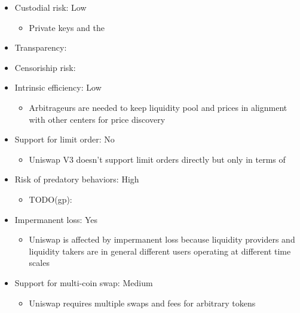 \documentclass[11pt, reqno]{amsart}
\begin{document}
\begin{itemize}
	\item Custodial risk: Low
	      \begin{itemize}
		      \item Private keys and the
	      \end{itemize}
	\item Transparency:
	\item Censoriship risk:
	\item Intrinsic efficiency: Low
	      \begin{itemize}
		      \item Arbitrageurs are needed to keep liquidity pool and prices in alignment with other centers for price discovery
	      \end{itemize}
	\item Support for limit order: No
	      \begin{itemize}
		      \item Uniswap V3 doesn't support limit orders directly but only in terms of
	      \end{itemize}
	\item Risk of predatory behaviors: High
	      \begin{itemize}
		      \item TODO(gp):
	      \end{itemize}
	\item Impermanent loss: Yes
	      \begin{itemize}
		      \item Uniswap is affected by impermanent loss because liquidity providers and liquidity takers are in general different users operating at different time scales
	      \end{itemize}
	\item Support for multi-coin swap: Medium
	      \begin{itemize}
		      \item Uniswap requires multiple swaps and fees for arbitrary tokens
	      \end{itemize}
\end{itemize}




\end{document}
